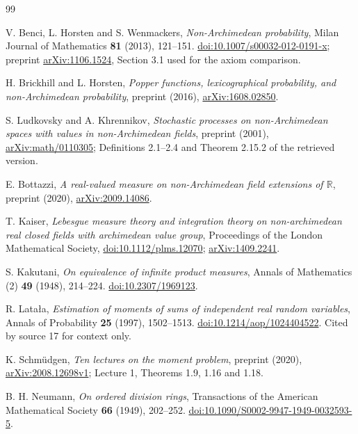\documentclass[11pt]{article}
\numberwithin{equation}{section}
\theoremstyle{definition}
\theoremstyle{remark}
\begin{document}
\clearpage
\begin{thebibliography}{99}
\raggedright

V. Benci, L. Horsten and S. Wenmackers,
\emph{Non-Archimedean probability},
Milan Journal of Mathematics \textbf{81} (2013), 121--151.
\href{https://doi.org/10.1007/s00032-012-0191-x}{doi:10.1007/s00032-012-0191-x};
preprint \href{https://arxiv.org/abs/1106.1524}{arXiv:1106.1524}, Section 3.1 used
for the axiom comparison.

H. Brickhill and L. Horsten,
\emph{Popper functions, lexicographical probability, and non-Archimedean
probability}, preprint (2016),
\href{https://arxiv.org/abs/1608.02850}{arXiv:1608.02850}.

S. Ludkovsky and A. Khrennikov,
\emph{Stochastic processes on non-Archimedean spaces with values in
non-Archimedean fields}, preprint (2001),
\href{https://arxiv.org/abs/math/0110305}{arXiv:math/0110305};
Definitions 2.1--2.4 and Theorem 2.15.2 of the retrieved version.

E. Bottazzi,
\emph{A real-valued measure on non-Archimedean field extensions of $\mathbb R$},
preprint (2020), \href{https://arxiv.org/abs/2009.14086}{arXiv:2009.14086}.

T. Kaiser,
\emph{Lebesgue measure theory and integration theory on non-archimedean real
closed fields with archimedean value group},
Proceedings of the London Mathematical Society,
\href{https://doi.org/10.1112/plms.12070}{doi:10.1112/plms.12070};
\href{https://arxiv.org/abs/1409.2241}{arXiv:1409.2241}.

S. Kakutani,
\emph{On equivalence of infinite product measures},
Annals of Mathematics (2) \textbf{49} (1948), 214--224.
\href{https://doi.org/10.2307/1969123}{doi:10.2307/1969123}.

R. Lata\l a,
\emph{Estimation of moments of sums of independent real random variables},
Annals of Probability \textbf{25} (1997), 1502--1513.
\href{https://doi.org/10.1214/aop/1024404522}{doi:10.1214/aop/1024404522}.
Cited by source 17 for context only.

K. Schm\"udgen,
\emph{Ten lectures on the moment problem}, preprint (2020),
\href{https://arxiv.org/abs/2008.12698v1}{arXiv:2008.12698v1}; Lecture 1,
Theorems 1.9, 1.16 and 1.18.

B. H. Neumann,
\emph{On ordered division rings},
Transactions of the American Mathematical Society \textbf{66} (1949), 202--252.
\href{https://doi.org/10.1090/S0002-9947-1949-0032593-5}{doi:10.1090/S0002-9947-1949-0032593-5}.


\end{thebibliography}
\end{document}
